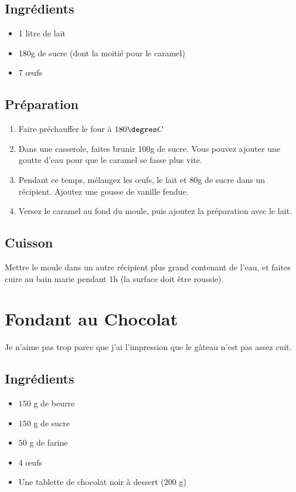 \subsection*{Ingrédients}
\begin{itemize}
\item 1 litre de lait
\item 180g de sucre (dont la moitié pour le caramel)
\item 7 œufs
\end{itemize}

\subsection*{Préparation}
\begin{enumerate}
\item Faire préchauffer le four à $180\degres C$
\item Dans une casserole, faites brunir 100g de sucre. Vous pouvez ajouter une goutte d'eau pour que le caramel se fasse plus vite.
\item Pendant ce temps, mélangez les œufs, le lait et 80g de sucre dans un récipient. Ajoutez une gousse de vanille fendue.
\item Versez le caramel au fond du moule, puis ajoutez la préparation avec le lait.
\end{enumerate}

\subsection*{Cuisson}
Mettre le moule dans un autre récipient plus grand contenant de l'eau, et faites cuire au bain marie pendant 1h (la surface doit être roussie).

\newpage
\section{Fondant au Chocolat}
 Je n'aime pas trop parce que j'ai l'impression que le gâteau n'est pas assez cuit.
\subsection*{Ingrédients}
\begin{itemize}
\item $150$ g de beurre
\item $150$ g de sucre
\item $50$ g de farine
\item $4$ œufs
\item Une tablette de chocolat noir à dessert ($200$ g)
\end{itemize}

